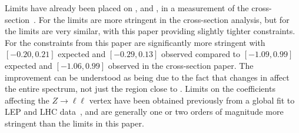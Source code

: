Limits have already been placed on \chg, \chgtil{} and \chwb{}, in
a measurement of the
\HFourL{} cross-section~\cite{Aad:2020mkp}. For \chg{}  the limits are
more stringent
in the  \HFourL{} cross-section analysis, but for \chgtil{} the limits are very similar,
with this paper providing slightly tighter constraints. For
\chwb{} the constraints from this paper are significantly more
stringent
with $[ -0.20, 0.21]$ expected and $[-0.29,0.13]$ observed compared
to $[-1.09,0.99]$ expected and $[-1.06,0.99]$ observed in the
\HFourL{} cross-section paper.
The improvement can be understood as being due to the fact that changes in
\chwb{}  affect the entire \mFourL{} spectrum, not just the region
close to  \mH{}. 
Limits on the coefficients affecting the $Z\to \ell\ell$ vertex have been obtained 
previously from a global fit to LEP and LHC data~\cite{Ellis:2018gqa}, and are generally 
one or two orders of magnitude more stringent than the limits in this paper.

